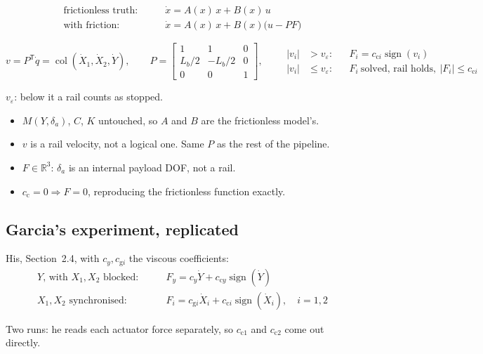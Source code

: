 \documentclass[12pt]{article}
\newcommand{\R}{\mathbb{R}}
\newcommand{\T}{\mathsf{T}}
\DeclareMathOperator{\col}{col}
\DeclareMathOperator{\sign}{sign}
\newcommand{\cc}{c_{\mathrm{c}}}
\newcommand{\panel}[1]{\subsection*{\Large #1}\vspace{1mm}}
\begin{document}
\begin{align*}
\text{frictionless truth:}&\qquad \dot x=A(x)\,x+B(x)\,u\\
\text{with friction:}&\qquad \dot x=A(x)\,x+B(x)\bigl(u-PF\bigr)
\end{align*}

\begin{equation*}
v=P^{\T}\dot q=\col(\dot X_1,\dot X_2,\dot Y),
\qquad
P=\left[\begin{smallmatrix}1&1&0\\ L_b/2&-L_b/2&0\\ 0&0&1\end{smallmatrix}\right],
\qquad
\begin{aligned}
|v_i|&>v_\varepsilon: &&F_i=c_{\mathrm{c}i}\sign(v_i)\\
|v_i|&\le v_\varepsilon: &&F_i\ \text{solved, rail holds},\ |F_i|\le c_{\mathrm{c}i}
\end{aligned}
\end{equation*}
\vspace{-4mm}

$v_\varepsilon$: below it a rail counts as stopped.

\begin{itemize}[itemsep=0.4mm,topsep=1mm]
\item $M(Y,\delta_a)$, $C$, $K$ untouched, so $A$ and $B$ are the frictionless model's.
\item $v$ is a rail velocity, not a logical one. Same $P$ as the rest of the pipeline.
\item $F\in\R^3$: $\delta_a$ is an internal payload DOF, not a rail.
\item $\cc=0\Rightarrow F=0$, reproducing the frictionless function exactly.
\end{itemize}

\newpage
\panel{Garcia's experiment, replicated}

His, Section~2.4, with $c_y,c_{\mathrm{g}i}$ the viscous coefficients:
\begin{align*}
\text{$Y$, with $X_1,X_2$ blocked:}&\qquad F_y=c_y\dot Y+c_{\mathrm{c}y}\sign(\dot Y)\\
\text{$X_1,X_2$ synchronised:}&\qquad F_i=c_{\mathrm{g}i}\dot X_i+c_{\mathrm{c}i}\sign(\dot X_i),
\quad i=1,2
\end{align*}
\vspace{-4mm}

Two runs: he reads each actuator force separately, so $c_{\mathrm{c}1}$ and $c_{\mathrm{c}2}$
come out directly.
\end{document}
